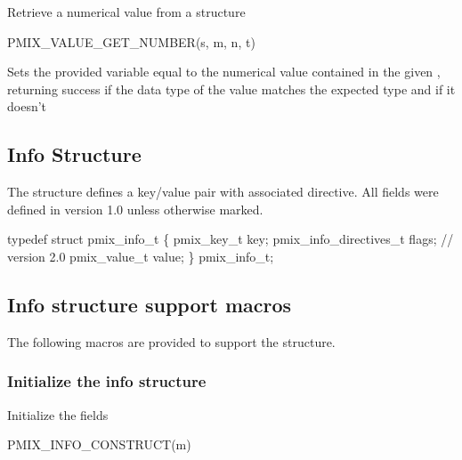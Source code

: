 Retrieve a numerical value from a  structure

\cspecificstart
\begin{codepar}
PMIX_VALUE_GET_NUMBER(s, m, n, t)
\end{codepar}
\cspecificend

\begin{arglist}
\end{arglist}

Sets the provided variable equal to the numerical value contained in the given , returning success if the data type of the value matches the expected type and  if it doesn't

\subsection{Info Structure}
\label{chap:struct:info}

The  structure defines a key/value pair with associated directive. All fields were defined in version 1.0 unless otherwise marked.

\cspecificstart
\begin{codepar}
typedef struct pmix_info_t \{
    pmix_key_t key;
    pmix_info_directives_t flags;    // version 2.0
    pmix_value_t value;
\} pmix_info_t;
\end{codepar}
\cspecificend

\subsection{Info structure support macros}
The following macros are provided to support the  structure.

\subsubsection{Initialize the info structure}

Initialize the  fields

\cspecificstart
\begin{codepar}
PMIX_INFO_CONSTRUCT(m)
\end{codepar}
\cspecificend

